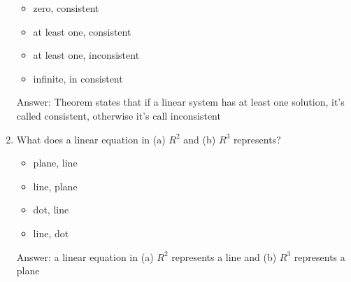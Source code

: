 \documentclass{article}
\begin{document}
\begin{enumerate}
        \begin{itemize}
            \item zero, consistent
            \item at least one, consistent
            \item at least one, inconsistent
            \item infinite, in consistent
        \end{itemize} 
        
        Answer: Theorem states that if a linear system has at least one solution, it's called consistent, otherwise it's call inconsistent
    
    \item What does a linear equation in (a) $R^{2}$ and (b) $R^{3}$ represents?
    
        \begin{itemize}
            \item plane, line
            \item line, plane
            \item dot, line
            \item line, dot
        \end{itemize} 
        
        Answer: a linear equation in (a) $R^{2}$ represents a line and (b) $R^{3}$ represents a plane
    
\end{enumerate}
\end{document}
